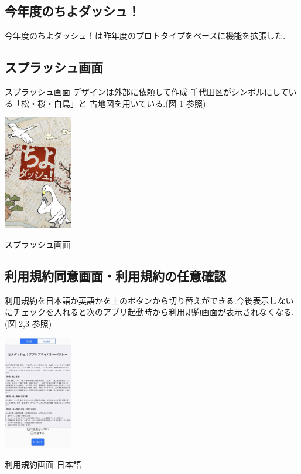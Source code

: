 \documentclass[a4paper, twoside]{jarticle}
\makeatletter
\newenvironment{figurehere}
  {\def\@captype{figure}}
  {}
\makeatother
\begin{document}
\begin{multicols}{2}
\subsection{今年度のちよダッシュ！}
今年度のちよダッシュ！は昨年度のプロトタイプをベースに機能を拡張した.

\subsection{スプラッシュ画面}
スプラッシュ画面
デザインは外部に依頼して作成
千代田区がシンボルにしている「松・桜・白鳥」と
古地図を用いている.(図 1 参照)
\begin{figurehere}
\begin{center}
\includegraphics[bb=30 50 550 1300,width=3cm]{./image01.jpg}%
\end{center}
\caption{スプラッシュ画面}\label{fig:1}
\end{figurehere}

\subsection{利用規約同意画面・利用規約の任意確認}
利用規約を日本語か英語かを上のボタンから切り替えができる.今後表示しないにチェックを入れると次のアプリ起動時から利用規約画面が表示されなくなる.(図 2,3 参照)
\begin{figurehere}
\begin{center}
\includegraphics[bb=30 50 550 1300,width=3cm]{./image02.jpg}%
\end{center}
\caption{利用規約画面 日本語}\label{fig:2}


\end{figurehere}
\end{multicols}
\end{document}
